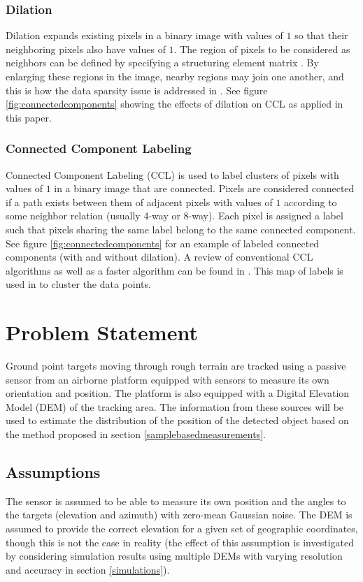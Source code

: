 \documentclass[journal]{IEEEtran}
\begin{document}
\subsubsection{Dilation}
Dilation expands existing pixels in a binary image with values of $1$ so that their neighboring pixels also have values of $1$. The region of pixels to be considered as neighbors can be defined by specifying a structuring element matrix \cite{ravankar2015connected}. By enlarging these regions in the image, nearby regions may join one another, and this is how the data sparsity issue is addressed in \cite{ravankar2015connected}. See figure \ref{fig:connectedcomponents} showing the effects of dilation on CCL as applied in this paper.

\subsubsection{Connected Component Labeling}
Connected Component Labeling (CCL) is used to label clusters of pixels with values of $1$ in a binary image that are connected. Pixels are considered connected if a path exists between them of adjacent pixels with values of $1$ according to some neighbor relation (usually 4-way or 8-way). Each pixel is assigned a label such that pixels sharing the same label belong to the same connected component. See figure \ref{fig:connectedcomponents} for an example of labeled connected components (with and without dilation). A review of conventional CCL algorithms as well as a faster algorithm can be found in \cite{he2009fast}. This map of labels is used in \cite{ravankar2015connected} to cluster the data points.









\section{Problem Statement} \label{problemstatement}
Ground point targets moving through rough terrain are tracked using a passive sensor from an airborne platform equipped with sensors to measure its own orientation and position. The platform is also equipped with a Digital Elevation Model (DEM) of the tracking area. The information from these sources will be used to estimate the distribution of the position of the detected object based on the method proposed in section \ref{samplebasedmeasurements}.

\subsection{Assumptions} \label{probstatementassumptions}
The sensor is assumed to be able to measure its own position and the angles to the targets (elevation and azimuth) with zero-mean Gaussian noise. The DEM is assumed to provide the correct elevation for a given set of geographic coordinates, though this is not the case in reality (the effect of this assumption is investigated by considering simulation results using multiple DEMs with varying resolution and accuracy in section \ref{simulations}).
\end{document}
